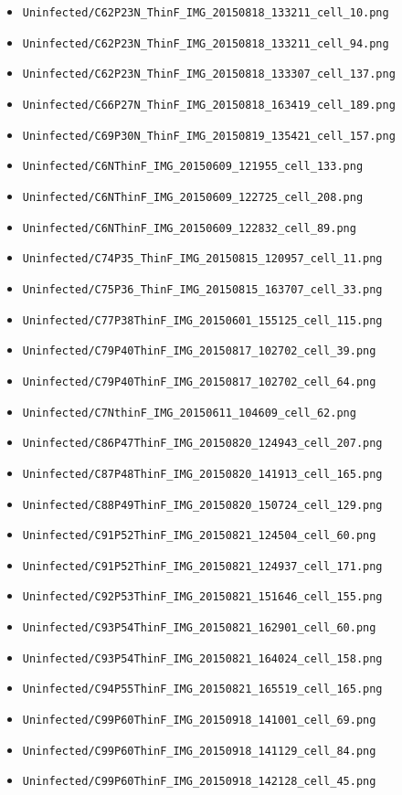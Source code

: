 \begin{itemize}
\item \texttt{Uninfected/C62P23N\_ThinF\_IMG\_20150818\_133211\_cell\_10.png}
\item \texttt{Uninfected/C62P23N\_ThinF\_IMG\_20150818\_133211\_cell\_94.png}
\item \texttt{Uninfected/C62P23N\_ThinF\_IMG\_20150818\_133307\_cell\_137.png}
\item \texttt{Uninfected/C66P27N\_ThinF\_IMG\_20150818\_163419\_cell\_189.png}
\item \texttt{Uninfected/C69P30N\_ThinF\_IMG\_20150819\_135421\_cell\_157.png}
\item \texttt{Uninfected/C6NThinF\_IMG\_20150609\_121955\_cell\_133.png}
\item \texttt{Uninfected/C6NThinF\_IMG\_20150609\_122725\_cell\_208.png}
\item \texttt{Uninfected/C6NThinF\_IMG\_20150609\_122832\_cell\_89.png}
\item \texttt{Uninfected/C74P35\_ThinF\_IMG\_20150815\_120957\_cell\_11.png}
\item \texttt{Uninfected/C75P36\_ThinF\_IMG\_20150815\_163707\_cell\_33.png}
\item \texttt{Uninfected/C77P38ThinF\_IMG\_20150601\_155125\_cell\_115.png}
\item \texttt{Uninfected/C79P40ThinF\_IMG\_20150817\_102702\_cell\_39.png}
\item \texttt{Uninfected/C79P40ThinF\_IMG\_20150817\_102702\_cell\_64.png}
\item \texttt{Uninfected/C7NthinF\_IMG\_20150611\_104609\_cell\_62.png}
\item \texttt{Uninfected/C86P47ThinF\_IMG\_20150820\_124943\_cell\_207.png}
\item \texttt{Uninfected/C87P48ThinF\_IMG\_20150820\_141913\_cell\_165.png}
\item \texttt{Uninfected/C88P49ThinF\_IMG\_20150820\_150724\_cell\_129.png}
\item \texttt{Uninfected/C91P52ThinF\_IMG\_20150821\_124504\_cell\_60.png}
\item \texttt{Uninfected/C91P52ThinF\_IMG\_20150821\_124937\_cell\_171.png}
\item \texttt{Uninfected/C92P53ThinF\_IMG\_20150821\_151646\_cell\_155.png}
\item \texttt{Uninfected/C93P54ThinF\_IMG\_20150821\_162901\_cell\_60.png}
\item \texttt{Uninfected/C93P54ThinF\_IMG\_20150821\_164024\_cell\_158.png}
\item \texttt{Uninfected/C94P55ThinF\_IMG\_20150821\_165519\_cell\_165.png}
\item \texttt{Uninfected/C99P60ThinF\_IMG\_20150918\_141001\_cell\_69.png}
\item \texttt{Uninfected/C99P60ThinF\_IMG\_20150918\_141129\_cell\_84.png}
\item \texttt{Uninfected/C99P60ThinF\_IMG\_20150918\_142128\_cell\_45.png}
\end{itemize}
